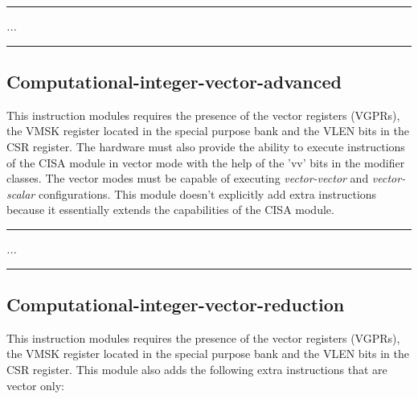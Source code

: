     \par\noindent\rule{\textwidth}{0.4pt}
    \textit{...}
    \par\noindent\rule{\textwidth}{0.4pt}

    \subsection{Computational-integer-vector-advanced}

        This instruction modules requires the presence of the vector registers (VGPRs), the VMSK register located in the special purpose bank and the VLEN bits in the CSR register. The hardware must also provide the ability to execute instructions of the CISA module in vector mode with the help of the 'vv' bits in the modifier classes. The vector modes must be capable of executing \textit{vector-vector} and \textit{vector-scalar} configurations. This module doesn't explicitly add extra instructions because it essentially extends the capabilities of the CISA module.

    \par\noindent\rule{\textwidth}{0.4pt}
    \textit{...}
    \par\noindent\rule{\textwidth}{0.4pt}

    \subsection{Computational-integer-vector-reduction}

        This instruction modules requires the presence of the vector registers (VGPRs), the VMSK register located in the special purpose bank and the VLEN bits in the CSR register. This module also adds the following extra instructions that are vector only:


